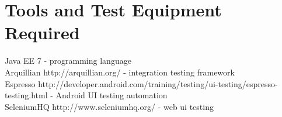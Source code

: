 \section{Tools and Test Equipment Required}

Java EE 7 - programming language\\
Arquillian http://arquillian.org/ - integration testing framework\\
Espresso http://developer.android.com/training/testing/ui-testing/espresso-testing.html - Android UI testing automation\\
SeleniumHQ http://www.seleniumhq.org/ - web ui testing\\